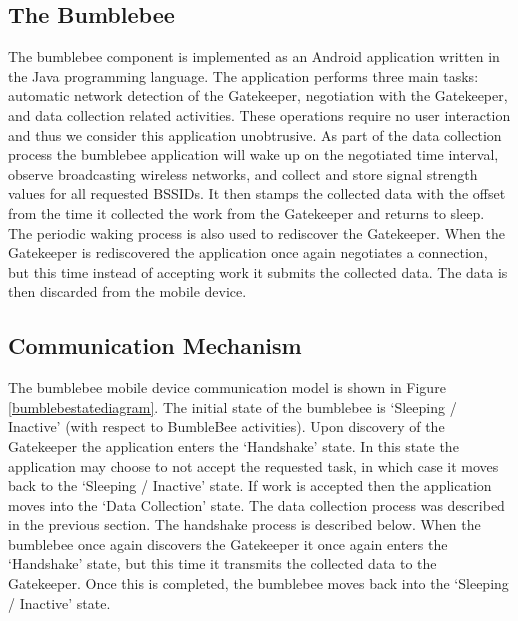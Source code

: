 \subsection{The Bumblebee}
%

The bumblebee component is implemented as an Android application written in the Java programming language. The application performs three main tasks: automatic network detection of the Gatekeeper, negotiation with the Gatekeeper, and data collection related activities. These operations require no user interaction and thus we consider this application unobtrusive. As part of the data collection process the bumblebee application will wake up on the negotiated time interval, observe broadcasting wireless networks, and collect and store signal strength values for all requested BSSIDs. It then stamps the collected data with the offset from the time it collected the work from the Gatekeeper and returns to sleep. The periodic waking process is also used to rediscover the Gatekeeper. When the Gatekeeper is rediscovered the application once again negotiates a connection, but this time instead of accepting work it submits the collected data. The data is then discarded from the mobile device.


\subsection{Communication Mechanism}
%


The bumblebee mobile device communication model is shown in Figure \ref{bumblebestatediagram}. The initial state of the bumblebee is ‘Sleeping / Inactive’ (with respect to BumbleBee activities). Upon discovery of the Gatekeeper the application enters the ‘Handshake’ state. In this state the application may choose to not accept the requested task, in which case it moves back to the ‘Sleeping / Inactive’ state. If work is accepted then the application moves into the ‘Data Collection’ state. The data collection process was described in the previous section. The handshake process is described below. When the bumblebee once again discovers the Gatekeeper it once again enters the ‘Handshake’ state, but this time it transmits the collected data to the Gatekeeper. Once this is completed, the bumblebee moves back into the ‘Sleeping / Inactive’ state.

